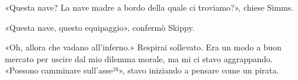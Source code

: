 «Questa nave? La nave madre a bordo della quale ci troviamo?», chiese
Simms.

«Questa nave, questo equipaggio», confermò Skippy.

«Oh, allora che vadano all'inferno.» Respirai sollevato. Era un modo a
buon mercato per uscire dal mio dilemma morale, ma mi ci stavo
aggrappando. «Possono camminare sull'asse²⁵», stavo iniziando a pensare
come un pirata.